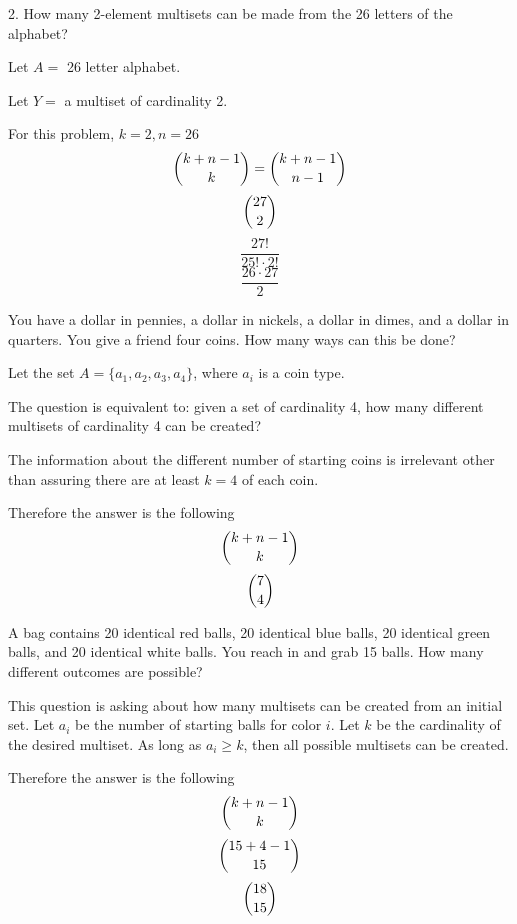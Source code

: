 \documentclass[openany, 12pt]{book}
\begin{document}
\begin{exercise}{}{}
	2. How many 2-element multisets can be made from the 26 letters of the alphabet?
	\begin{alist}
		\item Let $A=$ 26 letter alphabet.
		\item Let $Y=$ a multiset of cardinality 2.
		\item For this problem, $k=2, n=26$
		$$ \dbinom{k+n-1}{k} = \dbinom{k+n-1}{n-1} $$
		$$ \dbinom{27}{2}$$
		$$ \dfrac{27!}{25!\cdot2!}$$
		$$ \dfrac{26\cdot27}{2}$$
	\end{alist}
\end{exercise}

\begin{exercise}{}{}
	You have a dollar in pennies, a dollar in nickels, a dollar in dimes, and a dollar in quarters. You give a friend four coins. How many ways can this be done?
	\begin{alist}
		\item Let the set $A= \{a_1, a_2, a_3, a_4\}$, where $a_i$ is a coin type.
		\item The question is equivalent to: given a set of cardinality 4, how many
		different multisets of cardinality 4 can be created?
		\item The information about the different number of starting coins is
		irrelevant other than assuring there are at least $k=4$ of each coin.
		\item Therefore the answer is the following
		$$ \dbinom{k+n-1}{k} $$
		$$ \dbinom{7}{4}$$
	\end{alist}
\end{exercise}

\begin{exercise}{}{}
	A bag contains 20 identical red balls, 20 identical blue
	balls, 20 identical green balls, and 20 identical white balls. You reach in
	and grab 15 balls. How many different outcomes are possible?
	\begin{alist}
		\item This question is asking about how many multisets can be created from
		an initial set. Let $a_i$ be the number of starting balls for color $i$.
		Let $k$ be the cardinality of the desired multiset. As long as $a_i\geq k$,
		then all possible multisets can be created.
		\item Therefore the answer is the following
		$$ \dbinom{k+n-1}{k} $$
		$$ \dbinom{15+4-1}{15}$$
		$$ \dbinom{18}{15}$$
	\end{alist}
\end{exercise}
\end{document}
